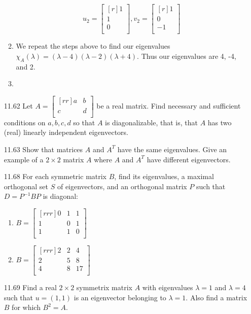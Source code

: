 \documentclass[12pt]{article}
\theoremstyle{definition}
\theoremstyle{plain}
\begin{document}
\begin{enumerate}
\begin{enumerate}
	\[ u_{2} = \begin{bmatrix}[r]1\\1\\0\\\end{bmatrix}, v_2=\begin{bmatrix}[r]1\\0\\-1\\\end{bmatrix} \]
	\item We repeat the steps above to find our eigenvalues $\chi_A(\lambda)=(\lambda-4)(\lambda-2)(\lambda+4)$. Thus our eigenvalues are 4, -4, and 2.
	\item 
	\end{enumerate}
\item[11.62]Let $A=\begin{bmatrix}[rr]a&b\\c&d\\\end{bmatrix}$ be a real matrix. Find necessary and sufficient conditions on $a,b,c,d$ so that $A$ is diagonalizable, that is, that $A$ has two (real) linearly independent eigenvectors.
\item[11.63]Show that matrices $A$ and $A^T$ have the same eigenvalues. Give an example of a $2 \times 2$ matrix $A$ where $A$ and $A^T$ have different eigenvectors.
\item[11.68]For each symmetric matrix $B$, find its eigenvalues, a maximal orthogonal set $S$ of eigenvectors, and an orthogonal matrix $P$ such that $D=P^{-1}BP$ is diagonal:
	\begin{enumerate}
	\item $B=\begin{bmatrix}[rrr]0&1&1\\1&0&1\\1&1&0\\\end{bmatrix}$
	\item $B=\begin{bmatrix}[rrr]2&2&4\\2&5&8\\4&8&17\\\end{bmatrix}$
	\end{enumerate}
\item[11.69]Find a real $2 \times 2$ symmetrix matrix $A$ with eigenvalues $\lambda = 1$ and $\lambda = 4$ such that $u=(1,1)$ is an eigenvector belonging to $\lambda=1$. Also find a matrix $B$ for which $B^2=A$.

\end{enumerate}
\end{document}
